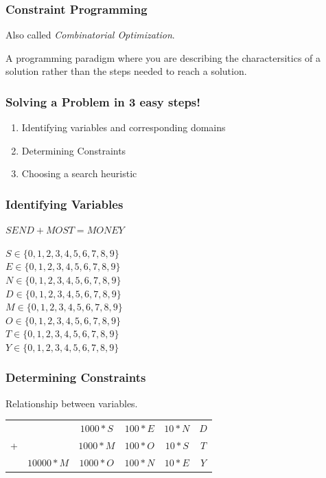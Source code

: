 \begin{frame}
	\frametitle{Constraint Programming}
	Also called \textit{Combinatorial Optimization}.

	\vspace{1cm}

	A programming paradigm where you are describing the charactersitics of a solution
	rather than the steps needed to reach a solution.
\end{frame}

\begin{frame}
	\frametitle{Solving a Problem in 3 easy steps!}

	\begin{enumerate}
		\item Identifying variables and corresponding domains
		\item Determining Constraints
		\item Choosing a search heuristic
	\end{enumerate}
\end{frame}

\begin{frame}
	\frametitle{Identifying Variables}
	$SEND + MOST = MONEY$
	
	\vspace{0.5cm}
	\noindent
	$S \in \{0, 1, 2, 3, 4, 5, 6, 7, 8, 9\}$ \\
	$E \in \{0, 1, 2, 3, 4, 5, 6, 7, 8, 9\}$ \\
	$N \in \{0, 1, 2, 3, 4, 5, 6, 7, 8, 9\}$ \\
	$D \in \{0, 1, 2, 3, 4, 5, 6, 7, 8, 9\}$ \\
	$M \in \{0, 1, 2, 3, 4, 5, 6, 7, 8, 9\}$ \\
	$O \in \{0, 1, 2, 3, 4, 5, 6, 7, 8, 9\}$ \\
	$T \in \{0, 1, 2, 3, 4, 5, 6, 7, 8, 9\}$ \\
	$Y \in \{0, 1, 2, 3, 4, 5, 6, 7, 8, 9\}$
\end{frame}

\begin{frame}
	\frametitle{Determining Constraints}
	Relationship between variables.

	\vspace{0.5cm}

	\begin{tabular}{cccccc}
		& & $1000 * S$ & $100 * E$ & $10 * N$ & $D$ \\
		+ &	& $1000 * M$ & $100 * O$ & $10 * S$ & $T$ \\
		\hline
		& $10000 * M$ & $1000 * O$ & $100 * N$ & $10 * E$ & $Y$
	\end{tabular}

\end{frame}

